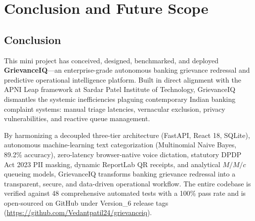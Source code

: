 \chapter{Conclusion and Future Scope}

\section{Conclusion}
This mini project has conceived, designed, benchmarked, and deployed \textbf{GrievanceIQ}—an enterprise-grade autonomous banking grievance redressal and predictive operational intelligence platform. Built in direct alignment with the APNI Leap framework at Sardar Patel Institute of Technology, GrievanceIQ dismantles the systemic inefficiencies plaguing contemporary Indian banking complaint systems: manual triage latencies, vernacular exclusion, privacy vulnerabilities, and reactive queue management.

By harmonizing a decoupled three-tier architecture (FastAPI, React 18, SQLite), autonomous machine-learning text categorization (Multinomial Naive Bayes, 89.2\% accuracy), zero-latency browser-native voice dictation, statutory DPDP Act 2023 PII masking, dynamic ReportLab QR receipts, and analytical $M/M/c$ queueing models, GrievanceIQ transforms banking grievance redressal into a transparent, secure, and data-driven operational workflow. The entire codebase is verified against 48 comprehensive automated tests with a 100\% pass rate and is open-sourced on GitHub under Version\_6 release tags (\url{https://github.com/Vedantpatil24/grievanceiq}).

